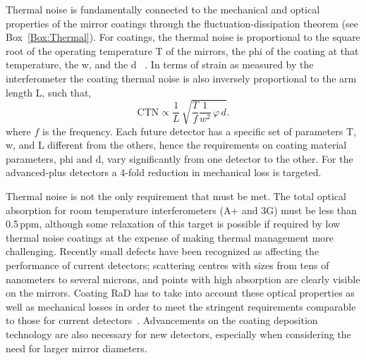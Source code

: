 Thermal noise is fundamentally connected to the mechanical and optical properties of the mirror coatings through the fluctuation-dissipation theorem (see Box~\ref{Box:Thermal}). For coatings, the thermal noise is proportional to the square root of the operating temperature \ac{T} of the mirrors, the \ac{phi}  of the coating at that temperature, the \ac{w}, and the \ac{d} ~\cite{levin1998internal}. In terms of strain as measured by the interferometer the coating thermal noise is also inversely proportional to the arm length \ac{L}, such that,
\begin{equation}
\text{CTN} \propto \frac{1}{L} \, \sqrt{\frac{T}{f} \frac{1}{w^2} \, \varphi \, d   }.
\end{equation}\label{eq:CTN}
where $f$ is the frequency. Each future detector has a specific set of parameters \ac{T}, \ac{w}, and \ac{L} different from the others, hence the requirements on coating material parameters, \ac{phi} and \ac{d}, vary significantly from one detector to the other. For the advanced-plus detectors a 4-fold reduction in mechanical loss is targeted.


Thermal noise is not the only requirement that must be met. The total optical absorption for room temperature interferometers (\ac{A+} and \ac{3G}) must be less than 0.5\,ppm, although some relaxation of this target is possible if required by low thermal noise coatings at the expense of making thermal management more challenging. Recently small defects have been recognized as affecting the performance of current detectors; scattering centres with sizes from tens of nanometers to several microns, and points with high absorption are clearly visible on the mirrors. Coating \ac{RaD}   has to take into account these optical properties as well as mechanical losses in order to meet the stringent requirements comparable to those for current detectors~\cite{AdvancedLIGO2015,AdvancedVirgo2015}. Advancements on the coating deposition technology are also necessary for new detectors, especially when considering the need for larger mirror diameters. 

